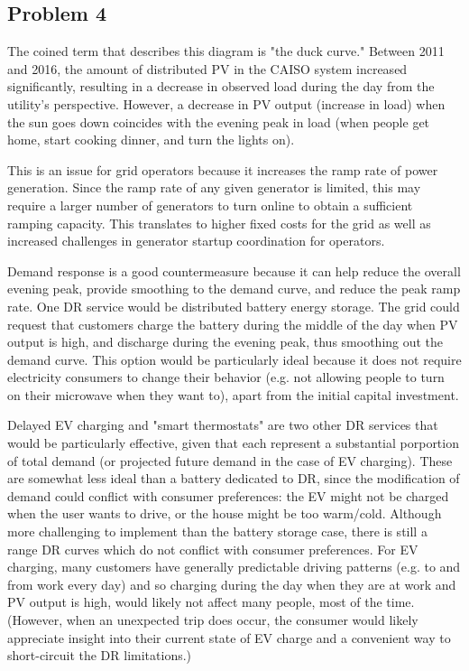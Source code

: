 \documentclass{homework}
\begin{document}
\begin{letterenum}
\section{Problem 4}
\begin{letterenum}
    \item The coined term that describes this diagram is "the duck curve."
        Between 2011 and 2016, the amount of distributed PV in the CAISO
        system increased significantly, resulting in a decrease
        in observed load during the day from the utility's perspective.
        However, a decrease in PV output (increase in load) when the sun goes down
        coincides with the evening peak in load (when people get home, start
        cooking dinner, and turn the lights on).

        This is an issue for grid operators because it increases the ramp
        rate of power generation. Since the ramp rate of any given generator is
        limited,
        this may require a larger number of generators to turn online 
        to obtain a sufficient ramping capacity. This translates
        to higher fixed costs for the grid as well as increased challenges
        in generator startup coordination for operators.

    \item Demand response is a good countermeasure because it can help reduce the
        overall evening peak, provide smoothing to the demand curve, and reduce
        the peak ramp rate. One DR service would be distributed battery
        energy storage. The grid could request that customers charge the battery during
        the middle of the day when PV output is high, and discharge during the evening
        peak, thus smoothing out the demand curve. This option would be particularly
        ideal because it does not require electricity consumers to change
        their behavior (e.g. not allowing people to turn on their microwave when
        they want to), apart from the initial capital investment.
        

        \indent Delayed EV charging and "smart thermostats" are two other DR services that
        would be particularly effective, given that each represent a substantial
        porportion of total demand (or projected future demand in the case of EV
        charging). These are somewhat less ideal than a battery dedicated
        to DR, since the modification of demand could conflict with
        consumer preferences: the EV might not be charged when the user wants to
        drive, or the house might be too warm/cold. Although more challenging to implement
        than the battery storage case,
        there is still a range DR curves which do not conflict with consumer preferences.
        For EV charging, many customers have generally predictable driving patterns
        (e.g. to and from work every day) and so charging during the day when
        they are at work and PV output is high, would likely not affect many people,
        most of the time. (However, when an unexpected trip does occur,
        the consumer would likely appreciate insight into their current state of
        EV charge and a convenient way to short-circuit the DR limitations.)
        

\end{letterenum}
\end{letterenum}
\end{document}
